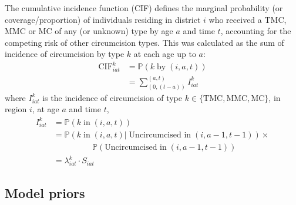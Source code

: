 \documentclass{article}
\begin{document}
\begin{appendix}
The cumulative incidence function (CIF) defines the marginal probability (or coverage/proportion) of individuals residing in district $i$ who received a TMC, MMC or MC of any (or unknown) type by age $a$ and time $t$, accounting for the competing risk of other circumcision types. This was calculated as the sum of incidence of circumcision by type $k$ at each age up to $a$:
\begin{equation*}
	\begin{split}
		\text{CIF}_{iat}^k &= \mathbb{P}(k \; \text{by} \; (i,a,t)) \\
		&= \sum_{(0,(t-a))}^{(a,t)} I^k_{iat}
	\end{split}
	\label{eqn::cuminc}
\end{equation*}
where $I^k_{iat}$ is the incidence of circumcision of type $k\in \{\textrm{TMC}, \textrm{MMC}, \textrm{MC}\}$, in region $i$, at age $a$ and time $t$, 
\begin{equation*}
	\begin{split}
		I_{iat}^k &= \mathbb{P}(k \; \text{in} \; (i,a,t)) \\
		       &= \mathbb{P}(k \; \text{in} \; (i,a,t) | \; \text{Uncircumcised in} \; (i,a-1,t-1))\times \\
		       & \;\;\;\;\;\;\;\;\;\;\;\;\;\;\;\;\;\mathbb{P}(\text{Uncircumcised in} \; (i,a-1,t-1)) \\
	    	   &= \lambda_{iat}^k \cdot S_{iat} 
	\end{split}
	\label{eqn::inc}
\end{equation*}


\subsection{Model priors}
\label{sec::priors}



\end{appendix}
\end{document}
